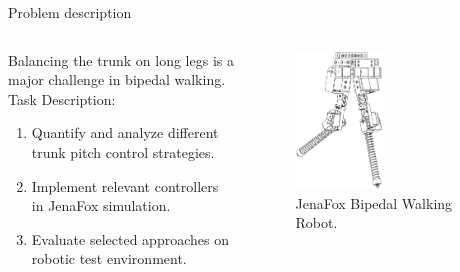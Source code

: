 \begin{frame}{Problem description}%
    \begin{columns}[T,onlytextwidth]%
        \begin{column}[T]{0.48\textwidth}%
            Balancing the trunk on long legs is a major challenge in bipedal walking.\\
            Task Description:
            \begin{enumerate}
                \item Quantify and analyze different trunk pitch control strategies.
                \item Implement relevant controllers in JenaFox simulation.
                \item Evaluate selected approaches on robotic test environment.
            \end{enumerate}%
        \end{column}%
        \begin{column}[T]{0.48\textwidth}%
            \begin{figure}[htb]%
                \centering%
                \includegraphics[width=0.5\textwidth]{figures/jena-fox-wireframe-transparent-black.png}%
                \caption{JenaFox Bipedal Walking Robot.}%
                \label{fig:jenafox}%
            \end{figure}%
        \end{column}%
    \end{columns}%
\end{frame}%
%
%
%